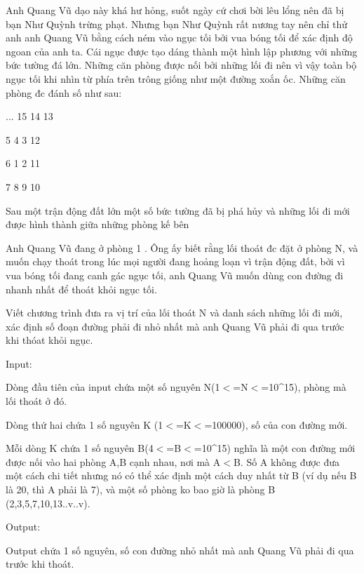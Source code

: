 



   Anh Quang Vũ dạo này khá hư hỏng, suốt ngày cứ chơi bời lêu lổng nên đã bị bạn Như Quỳnh trừng phạt. Nhưng bạn Như Quỳnh rất nương tay nên chỉ thử anh anh Quang Vũ bằng cách ném vào ngục tối bởi vua bóng tối để xác định độ ngoan của anh ta. Cái ngục được tạo dáng thành một hình lập phương với những bức tường đá lớn. Những căn phòng được nối bởi những lối đi nên vì vậy toàn bộ ngục tối khi nhìn từ phía trên trông giống như một đường xoắn ốc. Những căn phòng đc đánh số như sau:  



   ... 15  14  13  

   5   4    3  12  

   6   1    2  11  

   7   8    9  10  





   Sau một trận động đất lớn một số bức tường đã bị phá hủy và những lối đi mới được hình thành giữa những phòng kế bên  

   Anh Quang Vũ đang ở phòng 1 . Ông ấy biết rằng lối thoát đc đặt ở phòng N, và muốn chạy thoát trong lúc mọi người đang hoảng loạn vì trận động đất, bởi vì vua bóng tối đang canh gác ngục tối, anh Quang Vũ muốn dùng con đường đi nhanh nhất để thoát khỏi ngục tối.  

   Viết chương trình đưa ra vị trí của lối thoát N và danh sách những lối đi mới, xác định số đoạn đường phải đi nhỏ nhất mà anh Quang Vũ phải đi qua trước khi thóat khỏi ngục.  

            Input:         



   Dòng đầu tiên của input chứa một số nguyên N(1$<$=N$<$=10\textasciicircum15), phòng mà lối thoát ở đó.  

   Dòng thứ hai chứa 1 số nguyên K (1$<$=K$<$=100000), số của con đường mới.  

   Mỗi dòng K chứa 1 số nguyên B(4$<$=B$<$=10\textasciicircum15) nghĩa là một con đường mới được nối vào hai phòng A,B cạnh nhau, nơi mà A$<$B. Số A không được đưa một cách chi tiết nhưng nó có thể xác định một cách duy nhất từ B (ví dụ nếu B là 20, thì A phải là 7), và một số phòng ko bao giờ là phòng B (2,3,5,7,10,13..v..v).  

            Output:         



   Output chứa 1 số nguyên, số con đường nhỏ nhất mà anh Quang Vũ phải đi qua trước khi thoát.  

